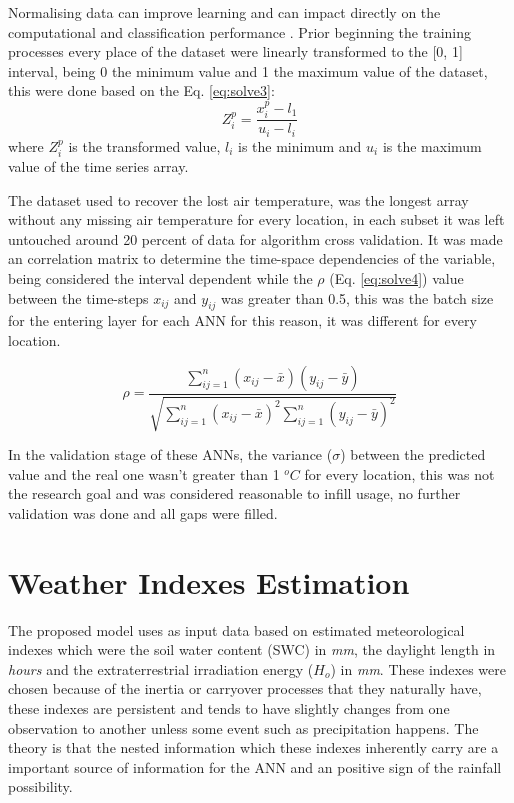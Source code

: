 Normalising data can improve learning and can impact directly on the computational and classification performance \cite{shanker1996effect}. Prior beginning the training processes every place of the dataset were linearly transformed to the [0, 1] interval, being 0 the minimum value and 1 the maximum value of the dataset, this were done based on the Eq. \ref{eq:solve3}:
\begin{equation}
\label{eq:solve3}
Z_i^p = \frac{x_i^p - l_1}{u_i -l_i}
\end{equation}
where $Z_i^p$ is the transformed value, $l_i$ is the minimum and $u_i$ is the maximum value of the time series array. 

The dataset used to recover the lost air temperature, was the longest array without any missing air temperature for every location, in each subset it was left 
untouched around 20 percent of data for algorithm cross validation. It was made an correlation matrix to determine the time-space dependencies of the variable, being 
considered the interval dependent while the $\rho$ (Eq. \ref{eq:solve4}) value between the time-steps $x_{ij}$ and $y_{ij}$ was greater than 0.5, this was the
batch size for the entering layer for each ANN for this reason, it was different for every location.

\begin{equation}
\label{eq:solve4}
\rho = \frac{ \sum\limits_{ij=1}^n (x_{ij} - \bar{x})(y_{ij} - \bar{y})}{\sqrt{ \sum\limits_{ij=1}^n (x_{ij} - \bar{x})^2 \sum\limits_{ij=1}^n (y_{ij} - \bar{y})^2}}
\end{equation}

In the validation stage of these ANNs, the variance ($\sigma$) between the predicted value and the real one wasn't greater than 1 $^oC$ for every location, this was not the research goal and was considered reasonable to infill usage, no further validation was done and all gaps were filled.

\section{Weather Indexes Estimation}
\label{sec:linux}

The proposed model uses as input data based on estimated meteorological indexes which were the soil water content (SWC) in \textit{mm}, the daylight length in \textit{hours} and the extraterrestrial irradiation energy ($H_o$) in \textit{mm}. These indexes were chosen because of the inertia or carryover processes that they naturally have, these indexes are persistent and tends to have slightly changes from one observation to another unless some event such as precipitation happens. The theory is that the nested information which these indexes inherently carry are a important source of information for the ANN and an positive sign of the rainfall possibility.

